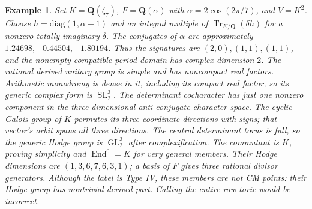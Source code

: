 \documentclass[10pt,reqno]{article}
\theoremstyle{emphasizedplain}
\theoremstyle{emphasizeddefinition}
\newtheorem{example}[theorem]{Example}
\theoremstyle{emphasizeddefinition}
\DeclareMathOperator{\End}{End}
\DeclareMathOperator{\GL}{GL}
\DeclareMathOperator{\SL}{SL}
\DeclareMathOperator{\Tr}{Tr}
\newcommand{\Q}{\mathbf Q}
\begin{document}
\begin{example}
Set $K=\Q(\zeta_7)$, $F=\Q(\alpha)$ with
$\alpha=2\cos(2\pi/7)$, and $V=K^2$. Choose
$h=\mathrm{diag}(1,\alpha-1)$ and an integral multiple of
$\Tr_{K/\Q}(\delta h)$ for a nonzero totally imaginary $\delta$.
The conjugates of $\alpha$ are approximately
$1.24698,-0.44504,-1.80194$. Thus the signatures are $(2,0),(1,1),(1,1)$,
and the nonempty compatible period domain has complex dimension $2$.
The rational derived unitary group is simple and has noncompact real
factors. Arithmetic monodromy is dense in it, including its compact real
factor, so its generic complex form is $\SL_2^3$.
The determinant cocharacter has just one nonzero component in the
three-dimensional anti-conjugate character space. The cyclic Galois group
of $K$ permutes its three coordinate directions with signs; that vector's
orbit spans all three directions. The central determinant torus is full,
so the generic Hodge group is $\GL_2^3$ after complexification.
The commutant is $K$, proving simplicity and $\End^0=K$ for very general
members. Their Hodge dimensions are $(1,3,6,7,6,3,1)$; a basis of $F$
gives three rational divisor generators. Although the label is Type IV,
these members are not CM points: their Hodge group has nontrivial derived
part. Calling the entire row toric would be incorrect.
\end{example}
\end{document}
